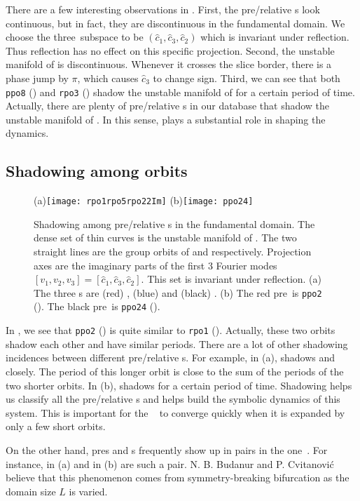 There are a few interesting observations in .
First, the pre/relative \po s look continuous,
but in fact, they are discontinuous in the fundamental domain.
We choose the three\dmn\ subspace to be $(\hat{c}_1, \hat{c}_3, \hat{c}_2)$
which is invariant under reflection. Thus reflection has no effect
on this specific projection. Second,
the unstable manifold of  is discontinuous.
Whenever it crosses the slice border, there is a phase jump by $\pi$,
which causes $\hat{c}_3$ to change sign. Third, we can see that both
\texttt{ppo8} () and \texttt{rpo3} () shadow
the unstable manifold of  for a certain period of time.
Actually, there are plenty of
pre/relative \po s in our database that shadow
the unstable manifold of .
In this sense,  plays a substantial role in shaping  the dynamics.

\subsection{Shadowing among orbits}

\begin{figure}[!ht]
  \centering
  (a)\texttt{[image: rpo1rpo5rpo22Im]}
  (b)\texttt{[image: ppo24]}
  \caption[Shadowing among pre/relative \po s]{
    Shadowing among pre/relative \po s in the fundamental domain.
    The dense set of thin curves is the unstable
    manifold of . The two  straight lines are the group orbits of
     and  respectively.
    Projection axes are the imaginary parts of the first 3 Fourier modes
    $[v_1, v_2, v_3] = [\hat{c}_1, \hat{c}_3, \hat{c}_2]$.
    This set is invariant under reflection.
    (a)
    The three \rpo s are (red) , (blue) 
    and (black) .
    (b)
    The red pre\po\ is \texttt{ppo2} ().
    The black pre\po\ is \texttt{ppo24} ().
  }
  \label{fig:shadow}
\end{figure}

In , we see that \texttt{ppo2} ()
is quite similar to \texttt{rpo1} (). Actually,
these two orbits shadow each other and have similar
periods. There are a lot of other shadowing incidences between
different pre/relative \po s. For example, in
(a),  shadows  and
 closely. The period of this longer orbit is close to the
sum of the periods of the two shorter orbits. In (b),
 shadows  for a certain period of time.
Shadowing helps us classify all the
pre/relative \po s and helps build the symbolic
dynamics of this system. This is important for the \Fd\
 to converge quickly when it is expanded by only a few short
orbits\rf{DasBuch}.

On the other hand, pre\po s and \rpo s frequently show up in pairs
in the one\dmn\ \KSe. For instance,
 in (a) and  in
\reffig{fig:shadow}(b) are such a pair.
N. B. Budanur and P. Cvitanovi\'c believe that this
phenomenon comes from symmetry-breaking bifurcation as
the domain size $L$ is varied.
